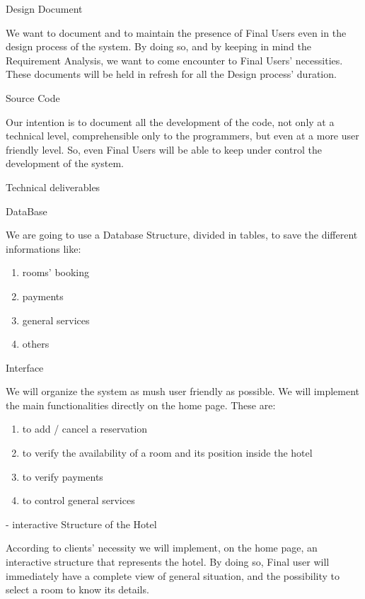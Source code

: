Design Document
	
	We want to document and to maintain the presence of Final Users even in the design process of the system. By doing so, and by keeping in mind the Requirement Analysis, we want to come encounter to Final Users’ necessities. 
	These documents will be held in refresh for all the Design process’ duration.


Source Code
		
	Our intention is to document all the development of the code, not only at a technical level, comprehensible only to the programmers, but even at a more user friendly level. So, even Final Users will be able to keep under control the development of the system.

	








Technical deliverables

DataBase 
		
	We are going to use a Database Structure, divided in tables, to save the different informations like:
\begin{enumerate}
	\item rooms’ booking 
	\item payments
	\item general services 
	\item others
\end{enumerate}

Interface  
	
	We will organize the system as mush user friendly as possible. We will implement the main functionalities directly on the home page. These are:
\begin{enumerate}
	\item to add / cancel a reservation
	\item to verify the availability of a room and its position inside the hotel
	\item to verify payments
	\item to control general services
\end{enumerate}

 
	- interactive Structure of the Hotel 
	
	According to clients’ necessity we will implement, on the home page, an interactive structure that represents the hotel. By doing so, Final user will immediately have a complete view of general situation, and the possibility to select a room to know its details.





